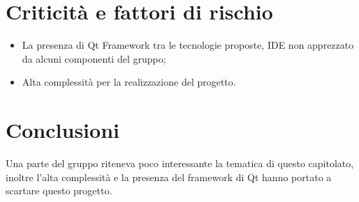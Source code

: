 \section{Criticità e fattori di rischio}
\begin{itemize}
	\item La presenza di Qt Framework tra le tecnologie proposte, IDE non apprezzato da alcuni componenti del gruppo;
	\item Alta complessità per la realizzazione del progetto.
\end{itemize}
\section{Conclusioni}
Una parte del gruppo riteneva poco interessante la tematica di questo capitolato, inoltre l'alta complessità e la presenza del framework di Qt hanno portato a scartare questo progetto.